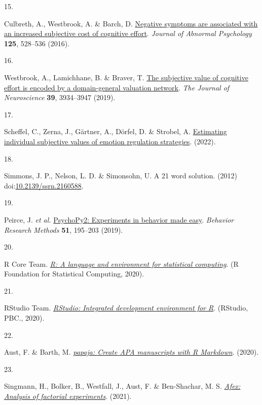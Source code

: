 \documentclass[
  man,floatsintext]{apa6}
\newlength{\cslhangindent}
\newlength{\csllabelwidth}
\newlength{\cslentryspacingunit} %
\newenvironment{CSLReferences}[2] %
 {%
  \setlength{\parindent}{0pt}
  \ifodd #1
  \let\oldpar\par
  \def\par{\hangindent=\cslhangindent\oldpar}
  \fi
  \setlength{\parskip}{#2\cslentryspacingunit}
 }%
 {}
\newcommand{\CSLLeftMargin}[1]{\parbox[t]{\csllabelwidth}{#1}}
\newcommand{\CSLRightInline}[1]{\parbox[t]{\linewidth - \csllabelwidth}{#1}\break}
\begin{document}
\begin{CSLReferences}{0}{0}
\leavevmode{}%
\CSLLeftMargin{15. }%
\CSLRightInline{Culbreth, A., Westbrook, A. \& Barch, D. \href{https://doi.org/10.1037/abn0000153}{Negative symptoms are associated with an increased subjective cost of cognitive effort}. \emph{Journal of Abnormal Psychology} \textbf{125}, 528--536 (2016).}

\leavevmode{}%
\CSLLeftMargin{16. }%
\CSLRightInline{Westbrook, A., Lamichhane, B. \& Braver, T. \href{https://doi.org/10.1523/jneurosci.3071-18.2019}{The subjective value of cognitive effort is encoded by a domain-general valuation network}. \emph{The Journal of Neuroscience} \textbf{39}, 3934--3947 (2019).}

\leavevmode{}%
\CSLLeftMargin{17. }%
\CSLRightInline{Scheffel, C., Zerna, J., Gärtner, A., Dörfel, D. \& Strobel, A. \href{https://psyarxiv.com/wr8qx}{Estimating individual subjective values of emotion regulation strategies}. (2022).}

\leavevmode{}%
\CSLLeftMargin{18. }%
\CSLRightInline{Simmons, J. P., Nelson, L. D. \& Simonsohn, U. A 21 word solution. (2012) doi:\href{https://doi.org/10.2139/ssrn.2160588}{10.2139/ssrn.2160588}.}

\leavevmode{}%
\CSLLeftMargin{19. }%
\CSLRightInline{Peirce, J. \emph{et al.} \href{https://doi.org/10.3758/s13428-018-01193-y}{{PsychoPy2}: {Experiments} in behavior made easy}. \emph{Behavior Research Methods} \textbf{51}, 195--203 (2019).}

\leavevmode{}%
\CSLLeftMargin{20. }%
\CSLRightInline{R Core Team. \emph{\href{https://www.R-project.org/}{R: {A} language and environment for statistical computing}}. (R Foundation for Statistical Computing, 2020).}

\leavevmode{}%
\CSLLeftMargin{21. }%
\CSLRightInline{RStudio Team. \emph{\href{http://www.rstudio.com/}{{RStudio: Integrated development environment for R}}}. (RStudio, PBC., 2020).}

\leavevmode{}%
\CSLLeftMargin{22. }%
\CSLRightInline{Aust, F. \& Barth, M. \emph{\href{https://github.com/crsh/papaja}{{papaja}: {Create} {APA} manuscripts with {R Markdown}}}. (2020).}

\leavevmode{}%
\CSLLeftMargin{23. }%
\CSLRightInline{Singmann, H., Bolker, B., Westfall, J., Aust, F. \& Ben-Shachar, M. S. \emph{\href{https://CRAN.R-project.org/package=afex}{Afex: {A}nalysis of factorial experiments}}. (2021).}


\end{CSLReferences}
\end{document}
